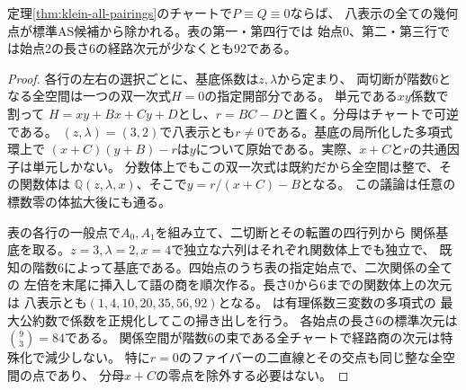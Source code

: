 \begin{theorem}\label{thm:all-zero-pairing-defect}
定理\ref{thm:klein-all-pairings}のチャートで$P\equiv Q\equiv0$ならば、
八表示の全ての幾何点が標準AS候補から除かれる。表の第一・第四行では
始点0、第二・第三行では始点2の長さ6の経路次元が少なくとも92である。
\end{theorem}
\begin{proof}
各行の左右の選択ごとに、基底係数は$z,\lambda$から定まり、
両切断が階数6となる全空間は一つの双一次式$H=0$の指定開部分である。
単元である$xy$係数で割って
$H=xy+Bx+Cy+D$とし、$r=BC-D$と置く。分母はチャートで可逆である。
$(z,\lambda)=(3,2)$で八表示とも$r\ne0$である。基底の局所化した多項式環上で
$(x+C)(y+B)-r$は$y$について原始である。実際、$x+C$と$r$の共通因子は単元しかない。
分数体上でもこの双一次式は既約だから全空間は整で、その関数体は
$\mathbb Q(z,\lambda,x)$、そこで$y=r/(x+C)-B$となる。
この議論は任意の標数零の体拡大後にも通る。

表の各行の一般点で$A_0,A_1$を組み立て、二切断とその転置の四行列から
関係基底を取る。$z=3,\lambda=2,x=4$で独立な六列はそれぞれ関数体上でも独立で、
既知の階数6によって基底である。四始点のうち表の指定始点で、二次関係の全ての
左倍を末尾に挿入して語の商を順次作る。長さ0から6までの関数体上の次元は
八表示とも$(1,4,10,20,35,56,92)$となる。
は有理係数三変数の多項式の
最大公約数で係数を正規化してこの掃き出しを行う。
各始点の長さ6の標準次元は$\binom93=84$である。
関係空間が階数6の束である全チャートで経路商の次元は特殊化で減少しない。
特に$r=0$のファイバーの二直線とその交点も同じ整な全空間の点であり、
分母$x+C$の零点を除外する必要はない。
\end{proof}
